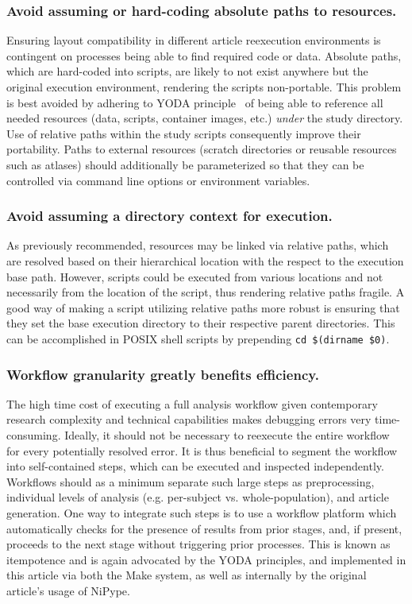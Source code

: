 \subsubsection{Avoid assuming or hard-coding absolute paths to resources.}
Ensuring layout compatibility in different article reexecution environments is contingent on processes being able to find required code or data.
Absolute paths, which are hard-coded into scripts, are likely to not exist anywhere but the original execution environment, rendering the scripts non-portable.
This problem is best avoided by adhering to YODA principle~\cite{yoda} of being able to reference all needed resources (data, scripts, container images, etc.) \emph{under} the study directory.
Use of relative paths within the study scripts consequently improve their portability.
Paths to external resources (scratch directories or reusable resources such as atlases) should additionally be parameterized so that they can be controlled via command line options or environment variables.

\subsubsection{Avoid assuming a directory context for execution.}
As previously recommended, resources may be linked via relative paths, which are resolved based on their hierarchical location with the respect to the execution base path.
However, scripts could be executed from various locations and not necessarily from the location of the script, thus rendering relative paths fragile.
A good way of making a script utilizing relative paths more robust is ensuring that they set the base execution directory to their respective parent directories.
This can be accomplished in POSIX shell scripts by prepending \texttt{cd \textquotedbl\$(dirname \textquotedbl\$0\textquotedbl)\textquotedbl}.

\subsubsection{Workflow granularity greatly benefits efficiency.}
The high time cost of executing a full analysis workflow given contemporary research complexity and technical capabilities makes debugging errors very time-consuming.
Ideally, it should not be necessary to reexecute the entire workflow for every potentially resolved error.
It is thus beneficial to segment the workflow into self-contained steps, which can be executed and inspected independently.
Workflows should as a minimum separate such large steps as preprocessing, individual levels of analysis (e.g. per-subject vs. whole-population), and article generation.
One way to integrate such steps is to use a workflow platform which automatically checks for the presence of results from prior stages, and, if present, proceeds to the next stage without triggering prior processes.
This is known as itempotence and is again advocated by the YODA principles, and implemented in this article via both the Make system, as well as internally by the original article's usage of NiPype.

